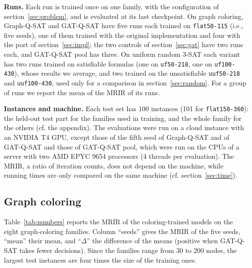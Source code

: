 \documentclass[11pt,a4paper]{article}
\newcommand{\code}[1]{\texttt{\def\_{\textunderscore\allowbreak}#1}}
\begin{document}
\smallskip
\noindent
{\bf Runs.} Each run is trained once on one family, with the configuration of
section~\ref{sec:problem}, and is evaluated at its last checkpoint. On graph
coloring, Graph-Q-SAT and GAT-Q-SAT have five runs each trained on
\code{flat50-115} (i.e., five seeds), one of them trained with the original implementation and
four with the port of section~\ref{sec:impl}; the two controls of
section~\ref{sec:gat} have two runs each, and GAT-Q-SAT pool has three. On uniform random 3-SAT each variant has two runs trained on satisfiable
formulas (one on \code{uf50-218}, one on \code{uf100-430}), whose results we
average, and two trained on the unsatisfiable \code{uuf50-218} and
\code{uuf100-430}, used only for a comparison in section~\ref{sec:random}. For a
group of runs we report the mean of the MRIR of its runs.

\smallskip
\noindent
{\bf Instances and machine.} Each test set has 100 instances (101 for
\code{flat150-360}): the held-out test part for the families used in training,
and the whole family for the others (cf. the appendix). The evaluations were run on a cloud
instance with an NVIDIA T4 GPU, except those of the fifth seed of Graph-Q-SAT
and of GAT-Q-SAT and those of GAT-Q-SAT pool, which were run on the CPUs of a
server with two AMD EPYC 9654 processors (4 threads per evaluation). The MRIR,
a ratio of iteration counts, does not depend on the machine, while running
times are only compared on the same machine (cf. section~\ref{sec:time}).

\subsection{Graph coloring}\label{sec:indist}

Table~\ref{tab:numbers} reports the MRIR of the coloring-trained models on the
eight graph-coloring families. Column ``seeds'' gives the MRIR of the five
seeds, ``mean'' their mean, and ``$\Delta$'' the
difference of the means (positive when GAT-Q-SAT takes fewer decisions). Since
the families range from 30 to 200 nodes, the largest test instances are four
times the size of the training ones.
\end{document}

